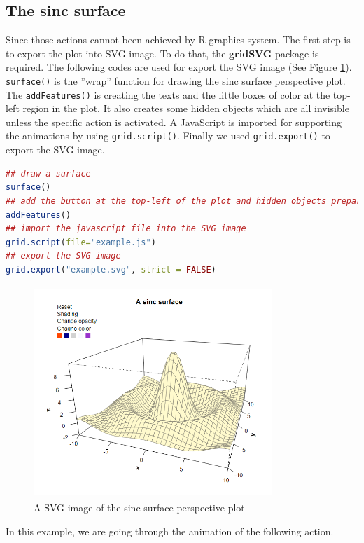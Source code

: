 \documentclass[11pt,twoside]{report}
\begin{document}
\subsection{The sinc surface}
Since those actions cannot been achieved by R graphics system. The first step is to export the plot into
SVG image. To do that, the \textbf{gridSVG} package is required. The following codes are used for export the SVG image (See Figure \ref{Example_6.3.01}). \texttt{surface()} is the ''wrap'' function for drawing the sinc surface perspective plot.
The \texttt{addFeatures()} is creating the texts and the little boxes of color at the top-left region in the plot.
It also creates some hidden objects which are all invisible unless the specific action is activated. A
JavaScript is imported for supporting the animations by using \texttt{grid.script()}. Finally we used \texttt{grid.export()} to export the SVG image.
\begin{lstlisting}[language = R]
## draw a surface
surface()  
## add the button at the top-left of the plot and hidden objects prepare for animation
addFeatures() 
## import the javascript file into the SVG image
grid.script(file="example.js") 
## export the SVG image
grid.export("example.svg", strict = FALSE) 
\end{lstlisting}
\begin{figure}[h]
	\begin{center}
		\includegraphics[height = 8cm, width = 9cm]{figure/svg/origin_1.PNG}
		\caption{A SVG image of the sinc surface perspective plot}
		\label{Example_6.3.01}
	\end{center}
\end{figure}



\newpage
In this example, we are going through the animation of the following action. 
\end{document}
